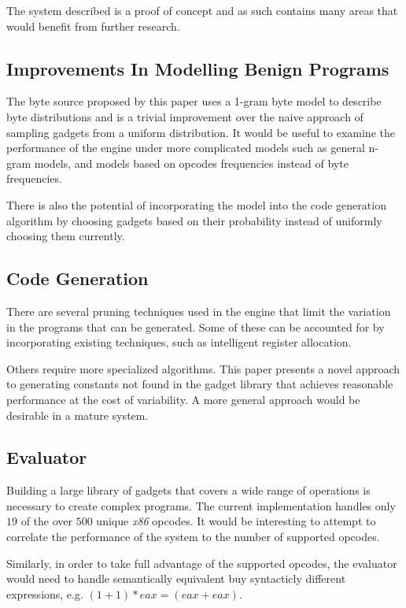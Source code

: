     The system described is a proof of concept and as such contains many areas
    that would benefit from further research.

    \subsection{Improvements In Modelling Benign Programs}

    The byte source proposed by this paper uses a 1-gram byte model to describe
    byte distributions and is a trivial improvement over the naive approach of
    sampling gadgets from a uniform distribution. It would be useful to examine
    the performance of the engine under more complicated models such as general
    n-gram models, and models based on opcodes frequencies instead of byte
    frequencies.

    There is also the potential of incorporating the model into the code
    generation algorithm by choosing gadgets based on their probability instead
    of uniformly choosing them currently.

    \subsection{Code Generation}

    There are several pruning techniques used in the engine that limit the
    variation in the programs that can be generated. Some of these can be
    accounted for by incorporating existing techniques, such as intelligent
    register allocation\cite{register-coloring}.

    Others require more specialized algorithms. This paper presents a novel
    approach to generating constants not found in the gadget library that
    achieves reasonable performance at the cost of variability. A more general
    approach would be desirable in a mature system.

    \subsection{Evaluator}

    Building a large library of gadgets that covers a wide range of operations
    is necessary to create complex programs. The current implementation handles
    only $19$ of the over $500$ unique \emph{x86} opcodes. It would be
    interesting to attempt to correlate the performance of the system to the
    number of supported opcodes.

    Similarly, in order to take full advantage of the supported opcodes, the
    evaluator would need to handle semantically equivalent buy syntacticly
    different expressions, e.g. $(1+1)*eax = (eax+eax)$.

%
